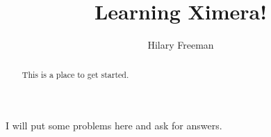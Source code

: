 \documentclass[handout]{ximera}
\title{Learning Ximera!}
\author{Hilary Freeman}
\begin{document}
\begin{abstract}
  This is a place to get started.
\end{abstract}
\maketitle

I will put some problems here and ask for answers.

\end{document}
